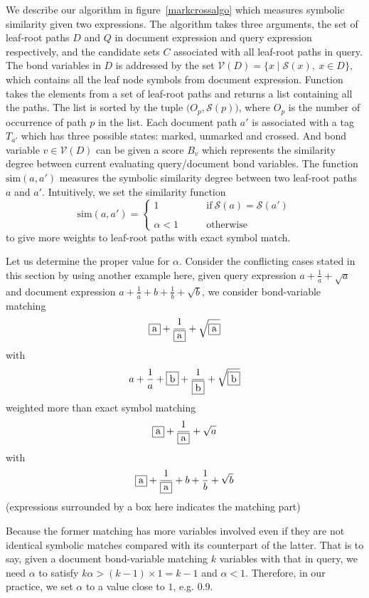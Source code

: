 \documentclass{acm_proc_article-sp}
\begin{document}
We describe our algorithm in figure~\ref{markcrossalgo} which measures symbolic similarity given two expressions. 
The  algorithm takes 
three arguments, the set of leaf-root paths $D$ and $Q$ in document expression and query expression respectively, and the candidate sets $C$ associated with all leaf-root paths in query. 
The bond variables in $D$ is addressed by the set $\mathcal{V}(D) = \{x \mid \mathcal{S}(x),\ x \in D\}$, which contains all the leaf node symbols from document expression.
Function  takes the elements from a set of leaf-root paths and returns a list containing all the paths. 
The list is sorted by the tuple $\big(O_p, \mathcal{S}(p)\big)$, where $O_p$ is the number of occurrence of path $p$ in the list. 
Each document path $a'$ is associated with a tag $T_{a'}$ which has three possible states: marked, unmarked and crossed. And bond variable $v \in \mathcal{V}(D)$ can be given a score $B_v$ which represents the similarity degree between current evaluating query/document bond variables. 
The function $\mathrm{sim}(a,a')$ measures the symbolic similarity degree between two leaf-root paths $a$ and $a'$. 
Intuitively, we set the similarity function
$$
\mathrm{sim}(a,a') = 
\left\{
\begin{array}{ll}
1    &\qquad \mathrm{if}\  \mathcal{S}(a) = \mathcal{S}(a')
\\
\\
\alpha < 1  &\qquad \mathrm{otherwise}
\end{array}
\right.
$$
to give more weights to leaf-root paths with exact symbol match.

Let us determine the proper value for $\alpha$. 
Consider the conflicting cases stated in this section by using another example here, 
given query expression $a+\frac 1 a + \sqrt{a}$ and document expression $a+\frac 1 a + b + \frac 1 b + \sqrt{b}$, we consider bond-variable matching 
$$\fbox{a}+\dfrac 1 {\fbox{a}} + \sqrt{\fbox{a}}$$
with 
$$a+\dfrac 1 a + \fbox{b} + \dfrac 1 {\fbox{b}} + \sqrt{\fbox{b}}$$
weighted more than exact symbol matching 
$$\fbox{a}+\dfrac 1 {\fbox{a}} + \sqrt{a}$$ 
with 
$$\fbox{a}+\dfrac 1 {\fbox{a}} + b + \dfrac 1 b + \sqrt{b}$$
(expressions surrounded by a box here indicates the matching part)

Because the former matching has more variables involved even if they are not identical symbolic matches compared with its counterpart of the latter. 
That is to say, given a document bond-variable matching $k$ variables with that in query, we need $\alpha$ to satisfy $ k \alpha > (k-1) \times 1 = k - 1 $
and $\alpha < 1$. 
Therefore, in our practice, we set $\alpha$ to a value close to $1$, e.g. $0.9$.
\end{document}
